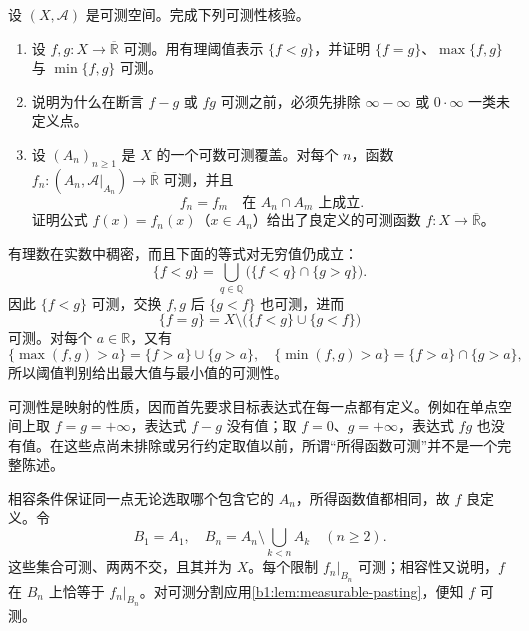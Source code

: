 \begin{exercise}\label{b1:ex:0401}
设 \((X,\mathcal A)\) 是可测空间。完成下列可测性核验。
\begin{enumerate}
\item 设 \(f,g:X\rightarrow\overline{\mathbb R}\) 可测。用有理阈值表示 \(\{f<g\}\)，并证明 \(\{f=g\}\)、\(\max\{f,g\}\) 与 \(\min\{f,g\}\) 可测。
\item 说明为什么在断言 \(f-g\) 或 \(fg\) 可测之前，必须先排除 \(\infty-\infty\) 或 \(0\cdot\infty\) 一类未定义点。
\item 设 \((A_n)_{n\geq1}\) 是 \(X\) 的一个可数可测覆盖。对每个 \(n\)，函数
\(f_n:(A_n,\mathcal A|_{A_n})\rightarrow\overline{\mathbb R}\) 可测，并且
\[
f_n=f_m\quad\text{在 }A_n\cap A_m\text{ 上成立}.
\]
证明公式 \(f(x)=f_n(x)\)（\(x\in A_n\)）给出了良定义的可测函数 \(f:X\rightarrow\overline{\mathbb R}\)。
\end{enumerate}
\end{exercise}
\begin{solution}
有理数在实数中稠密，而且下面的等式对无穷值仍成立：
\[
\{f<g\}
=\bigcup_{q\in\mathbb Q}
  \bigl(\{f<q\}\cap\{g>q\}\bigr).
\]
因此 \(\{f<g\}\) 可测，交换 \(f,g\) 后 \(\{g<f\}\) 也可测，进而
\[
\{f=g\}
=X\setminus\bigl(\{f<g\}\cup\{g<f\}\bigr)
\]
可测。对每个 \(a\in\mathbb R\)，又有
\[
\{\max(f,g)>a\}=\{f>a\}\cup\{g>a\},
\quad
\{\min(f,g)>a\}=\{f>a\}\cap\{g>a\},
\]
所以阈值判别给出最大值与最小值的可测性。

可测性是映射的性质，因而首先要求目标表达式在每一点都有定义。例如在单点空间上取 \(f=g=+\infty\)，表达式 \(f-g\) 没有值；取 \(f=0\)、\(g=+\infty\)，表达式 \(fg\) 也没有值。在这些点尚未排除或另行约定取值以前，所谓“所得函数可测”并不是一个完整陈述。

相容条件保证同一点无论选取哪个包含它的 \(A_n\)，所得函数值都相同，故 \(f\) 良定义。令
\[
B_1=A_1,
\quad
B_n=A_n\setminus\bigcup_{k<n}A_k\quad(n\geq2).
\]
这些集合可测、两两不交，且其并为 \(X\)。每个限制
\(f_n|_{B_n}\) 可测；相容性又说明，\(f\) 在 \(B_n\) 上恰等于
\(f_n|_{B_n}\)。对可测分割应用\cref{b1:lem:measurable-pasting}，便知 \(f\) 可测。
\end{solution}

